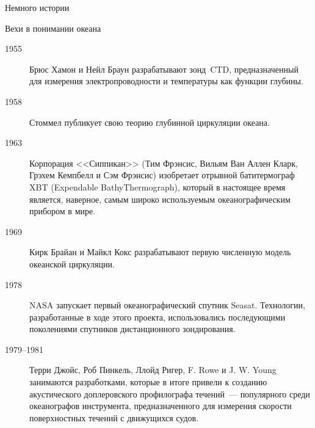 \begin{chapter}{Немного истории}
\begin{section}{Вехи в понимании океана}
\begin{description}
\item[1955] Брюс Хамон и Нейл Браун разрабатывают зонд~CTD, предназначенный
для измерения электропроводности и температуры как функции глубины.
%

\item[1958] Стоммел публикует свою теорию глубинной циркуляции океана.
%

\item[1963] Корпорация <<Сиппикан>> (Тим Фрэнсис,
Вильям Ван Аллен Кларк, Грэхем Кемпбелл и Сэм Фрэнсис) изобретает
отрывной батитермограф XBT (Expendable BathyThermograph), который 
в настоящее время является, наверное, самым широко используемым 
океанографическим прибором в мире.
%

\item[1969] Кирк Брайан и Майкл Кокс разрабатывают первую численную
модель океанской циркуляции.
%

\item[1978] NASA запускает первый океанографический спутник Seasat. 
Технологии, разработанные в ходе этого проекта, использовались последующими
поколениями спутников дистанционного зондирования.
%

\item[1979--1981] Терри Джойс, Роб Пинкель, Ллойд Ригер, F. Rowe и
J. W. Young занимаются разработками, которые в итоге привели к созданию
акустического доплеровского профилографа течений~--- популярного среди
океанографов инструмента, предназначенного для измерения скорости 
поверхностных течений с движущихся судов.
%


\end{description}
\end{section}
\end{chapter}
